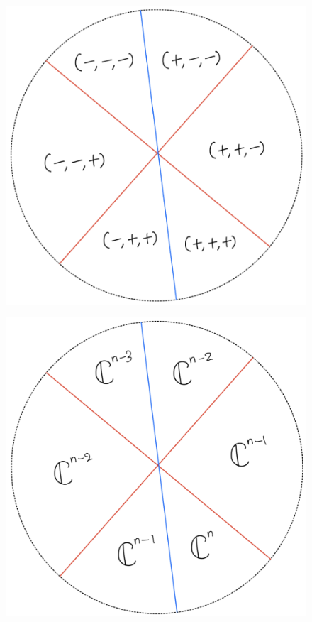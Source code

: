 \begin{figure}[H]
    \centering
    \includegraphics[scale = 0.45]{diagrams/lemma4/24.png}
    \caption{}
    \label{fig:your-label}
\end{figure}
\begin{figure}[H]
    \centering
    \includegraphics[scale = 0.45]{diagrams/cobord'4/25.png}
    \caption{}
    \label{fig:your-label}
\end{figure}
